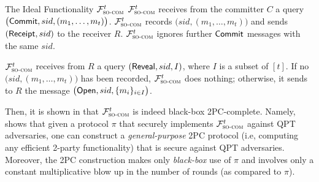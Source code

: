 \begin{FigureBox}[label={figure:functionality:so-com}]{The Ideal Functionality \textnormal{$\mathcal{F}^t_\textsc{so-com}$} \cite{EC:GLSV21,C:CCLY22}}
 $\mathcal{F}^t_\textsc{so-com}$ receives from the committer $C$ a query $\big(\mathsf{Commit}, sid, (m_1, \ldots, m_t)\big)$. $\mathcal{F}^t_\textsc{so-com}$ records $\big(sid, (m_1, \ldots, m_t)\big)$ and sends $(\mathsf{Receipt}, sid)$ to the receiver $R$. $\mathcal{F}^t_\textsc{so-com}$ ignores further $\mathsf{Commit}$ messages with the same $sid$.

 $\mathcal{F}^t_\textsc{so-com}$ receives from $R$ a query $(\mathsf{Reveal}, sid, I)$, where $I$ is a subset of $[t]$. If no $\big(sid, (m_1, \ldots, m_t)\big)$ has been recorded, $\mathcal{F}^t_\textsc{so-com}$ does nothing; otherwise, it sends to $R$ the message $\big(\mathsf{Open}, sid, \{m_i\}_{i\in I} \big)$. 
\end{FigureBox}




 Then, it is shown in \cite[Section 7.4]{C:CCLY22} that $\mathcal{F}^t_\textsc{so-com}$ is indeed black-box 2PC-complete. Namely, \cite[Section 7.4]{C:CCLY22} shows that given a protocol $\pi$ that securely implements $\mathcal{F}^t_\textsc{so-com}$ against QPT adversaries, one can construct a {\em general-purpose} 2PC protocol (i.e, computing any efficient 2-party functionality) that is secure against QPT adversaries. Moreover, the 2PC construction makes only {\em black-box} use of $\pi$ and involves only a constant multiplicative blow up in the number
of rounds (as compared to $\pi$).  


